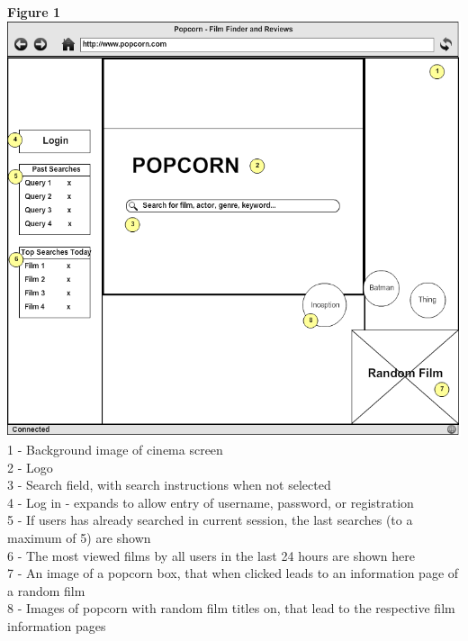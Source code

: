 \documentclass{sig-alt-release2}
\begin{document}
\textbf{Figure 1}\\
\includegraphics[scale=0.33]{wireframe1.png}\\
 
1 - Background image of cinema screen \\
2 - Logo \\
3 - Search field, with search instructions when not selected \\
4 - Log in - expands to allow entry of username, password, or registration \\
5 - If users has already searched in current session, the last searches (to a maximum of 5) are shown \\
6 - The most viewed films by all users in the last 24 hours are shown here \\
7 - An image of a popcorn box, that when clicked leads to an information page of a random film \\
8 - Images of popcorn with random film titles on, that lead to the respective film information pages\\
\end{document}
